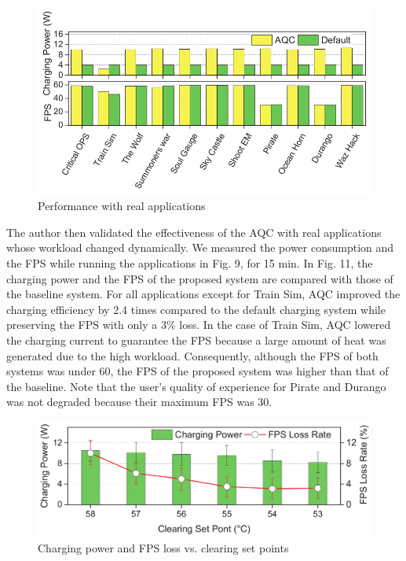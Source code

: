 \documentclass[conference]{IEEEtran}
\begin{document}
\begin{figure}[h!]
  \includegraphics[width=\linewidth]{images/image11.png}
  \caption{Performance with real applications\cite{b1}}
\end{figure}

The author \cite{b1} then validated the effectiveness of the AQC with real applications whose workload changed dynamically. We measured the power consumption and the FPS while running the applications in Fig. 9, for 15 min. In Fig. 11, the charging power and the FPS of the proposed system are compared with those of
the baseline system. For all applications except for Train Sim, AQC improved the charging efficiency by 2.4 times compared to the default charging system while preserving the FPS with only a 3\% loss. In the case of Train Sim, AQC lowered the charging current to guarantee the FPS because a large amount of heat was generated due to the high workload. Consequently, although the FPS of both systems was under 60, the FPS of the proposed system was higher than that of the baseline. Note that the user’s quality of experience for Pirate and Durango was not degraded because their maximum FPS was 30.

\begin{figure}[h!]
  \includegraphics[width=\linewidth]{images/image12.png}
  \caption{Charging power and FPS loss vs. clearing set points\cite{b1}}
\end{figure}
\end{document}
